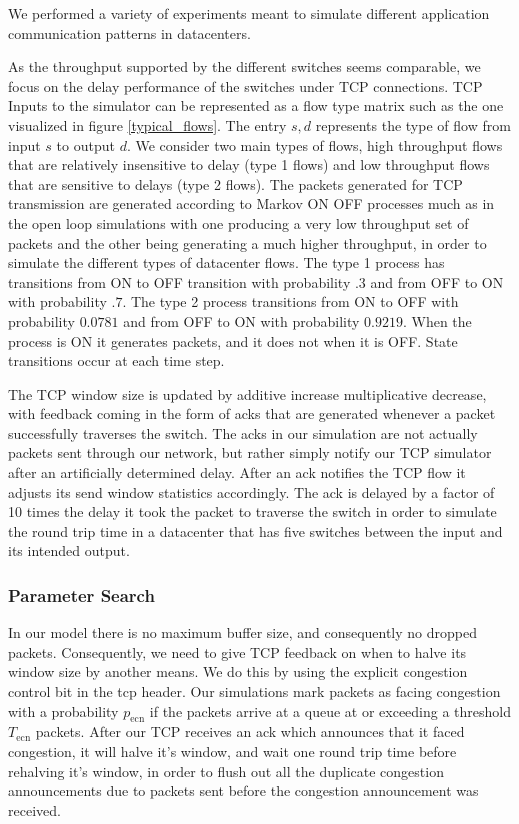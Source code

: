 \documentclass{IEEEtran}%
\begin{document}
We performed a variety of experiments meant to simulate different application communication patterns in datacenters.

As the throughput supported by the different switches seems comparable, we focus on the delay performance of the switches under TCP connections.  TCP Inputs to the simulator can be represented as a flow type matrix such as the one visualized in figure \ref{typical_flows}.  The entry $s,d$ represents the type of flow from input $s$ to output $d$.  We consider two main types of flows, high throughput flows that are relatively insensitive to delay (type 1 flows) and low throughput flows that are sensitive to delays (type 2 flows).  The packets generated for TCP transmission are generated according to Markov ON OFF processes much as in the open loop simulations with one producing a very low throughput set of packets and the other being generating a much higher throughput, in order to simulate the different types of datacenter flows.  The type 1 process has transitions from ON to OFF transition with probability $.3$ and from OFF to ON with probability $.7$.  The type 2 process transitions from ON to OFF with probability $0.0781$ and from OFF to ON with probability $0.9219$.  When the process is ON it generates packets, and it does not when it is OFF.   State transitions occur at each time step.

The TCP window size is updated by additive increase multiplicative decrease, with feedback coming in the form of acks that are generated whenever a packet successfully traverses the switch.  The acks in our simulation are not actually packets sent through our network, but rather simply notify our TCP simulator after an artificially determined delay.  After an ack notifies the TCP flow it adjusts its send window statistics accordingly.  The ack is delayed by a factor of 10 times the delay it took the packet to traverse the switch in order to simulate the round trip time in a datacenter that has five switches between the input and its intended output.

\subsubsection{Parameter Search}

In our model there is no maximum buffer size, and consequently no dropped packets.  Consequently, we need to give TCP feedback on when to halve its window size by another means.  We do this by using the explicit congestion control bit in the tcp header.  Our simulations mark packets as facing congestion with a probability $p_{\text{ecn}}$ if the packets arrive at a queue at or exceeding a threshold $T_{\text{ecn}}$ packets.  After our TCP receives an ack which announces that it faced congestion, it will halve it's window, and wait one round trip time before rehalving it's window, in order to flush out all the duplicate congestion announcements due to packets sent before the congestion announcement was received.
\end{document}
